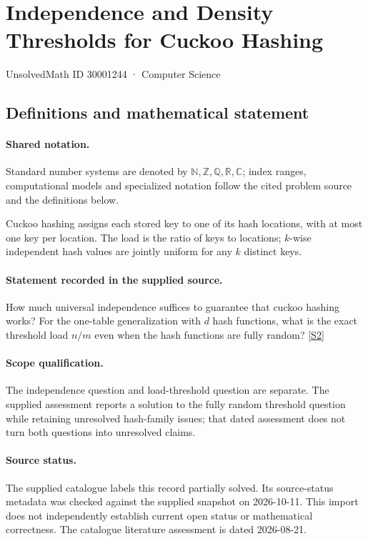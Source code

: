 \documentclass[11pt]{article}
\newcommand{\sref}[2]{\hyperlink{source:#1:#2}{[S#2]}}
\begin{document}
\setcounter{section}{30001243}
\section{Independence and Density Thresholds for Cuckoo Hashing}\label{30001244}
{\small\sffamily UnsolvedMath ID 30001244 · Computer Science}
\subsection{Definitions and mathematical statement}

\paragraph{Shared notation.}Standard number systems are denoted by $\mathbb N,\mathbb Z,\mathbb Q,\mathbb R,\mathbb C$; index ranges, computational models and specialized notation follow the cited problem source and the definitions below.


Cuckoo hashing assigns each stored key to one of its hash locations, with at most one key per location. The load is the ratio of keys to locations; $k$-wise independent hash values are jointly uniform for any $k$ distinct keys.
\paragraph{Statement recorded in the supplied source.}
How much universal independence suffices to guarantee that cuckoo hashing works? For the one-table generalization with $d$ hash functions, what is the exact threshold load $n/m$ even when the hash functions are fully random? \sref{30001244}{2}
\paragraph{Scope qualification.}
The independence question and load-threshold question are separate. The supplied assessment reports a solution to the fully random threshold question while retaining unresolved hash-family issues; that dated assessment does not turn both questions into unresolved claims.
\paragraph{Source status.}
The supplied catalogue labels this record partially solved. Its source-status metadata was checked against the supplied snapshot on 2026-10-11. This import does not independently establish current open status or mathematical correctness. The catalogue literature assessment is dated 2026-08-21.
\end{document}
